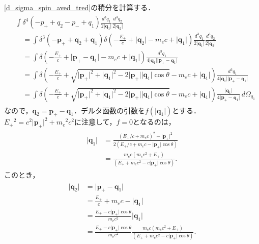 \eqref{d_sigma_spin_aved_tred}の積分を計算する．
\begin{align}
  \begin{split}
    & \int\delta^4(-p_+ + q_2 - p_- + q_1) \frac{d^3q_1}{2\lvert\boldsymbol{q}_1\rvert} \frac{d^3q_2}{2\lvert\boldsymbol{q}_2\rvert}\\
    &\quad = \int\delta^3(-\boldsymbol{p}_+ + \boldsymbol{q}_2 + \boldsymbol{q}_1) \delta\left(-\frac{E_+}{c} + \lvert\boldsymbol{q}_2\rvert - m_ec +\lvert\boldsymbol{q}_1\rvert\right) \frac{d^3q_1}{2\lvert\boldsymbol{q}_1\rvert}\frac{d^3q_2}{2\lvert\boldsymbol{q}_2\rvert}\\
    &\quad = \int \delta\left(-\frac{E_+}{c} + \lvert \boldsymbol{p}_+ - \boldsymbol{q}_1 \rvert - m_ec +\lvert\boldsymbol{q}_1\rvert\right) \frac{d^3q_1}{4\lvert\boldsymbol{q}_1\rvert \lvert \boldsymbol{p}_+ - \boldsymbol{q}_1 \rvert}\\
    &\quad = \int \delta\left(-\frac{E_+}{c} + \sqrt{\lvert\boldsymbol{p}_+\rvert^2 + \lvert\boldsymbol{q}_1\rvert^2 - 2\lvert\boldsymbol{p}_+\rvert \lvert\boldsymbol{q}_1\rvert \cos\theta} - m_ec +\lvert\boldsymbol{q}_1\rvert\right) \frac{d^3q_1}{4\lvert\boldsymbol{q}_1\rvert \lvert \boldsymbol{p}_+ - \boldsymbol{q}_1 \rvert}\\
    &\quad = \int \delta\left(-\frac{E_+}{c} + \sqrt{\lvert\boldsymbol{p}_+\rvert^2 + \lvert\boldsymbol{q}_1\rvert^2 - 2\lvert\boldsymbol{p}_+\rvert \lvert\boldsymbol{q}_1\rvert \cos\theta} - m_ec +\lvert\boldsymbol{q}_1\rvert\right) \frac{\lvert\boldsymbol{q}_1\rvert}{4\lvert \boldsymbol{p}_+ - \boldsymbol{q}_1 \rvert}\,d\Omega_{q_1}
  \end{split}
  \label{delta_int}
\end{align}
なので，$\boldsymbol{q}_2 = \boldsymbol{p}_+ - \boldsymbol{q}_1$．デルタ函数の引数を$f(\lvert\boldsymbol{q}_1\rvert)$とする．
$E_+{}^2 = c^2\lvert\boldsymbol{p}_+\rvert^2 + m_e{}^2c^2$に注意して，$f=0$となるのは，
\begin{align}
  \begin{split}
    \lvert\boldsymbol{q}_1\rvert &= \frac{(E_+/c + m_ec)^2 - \lvert\boldsymbol{p}_+\rvert^2}{2(E_+/c + m_ec - \lvert\boldsymbol{p}_+\rvert\cos\theta)}\\
    &= \frac{m_ec(m_ec^2 + E_+)}{(E_+ + m_ec^2 - c\lvert\boldsymbol{p}_+\rvert\cos\theta)}.
  \end{split}\label{q1_scatter}
\end{align}
このとき，
\begin{align}
  \begin{split}
    \lvert\boldsymbol{q}_2\rvert &= \lvert\boldsymbol{p}_+ - \boldsymbol{q}_1\rvert \\
    &= \frac{E_+}{c} + m_ec - \lvert\boldsymbol{q}_1\rvert \\
    &= \frac{E_+ - c\lvert\boldsymbol{p}_+\rvert\cos\theta}{m_ec^2}\lvert\boldsymbol{q}_1\rvert\\
    &= \frac{E_+ - c\lvert\boldsymbol{p}_+\rvert\cos\theta}{m_ec^2}\frac{m_ec(m_ec^2 + E_+)}{(E_+ + m_ec^2 - c\lvert\boldsymbol{p}_+\rvert\cos\theta)}.
  \end{split}\label{q2_scatter}
\end{align}
